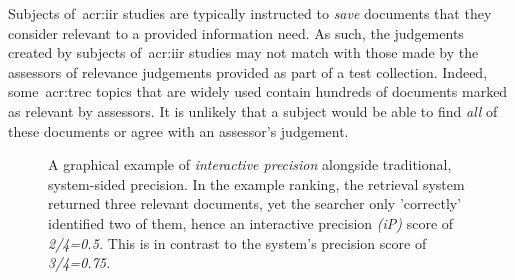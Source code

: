 Subjects of~\gls{acr:iir} studies are typically instructed to \emph{save} documents that they consider relevant to a provided information need. As such, the judgements created by subjects of~\gls{acr:iir} studies may not match with those made by the assessors of relevance judgements provided as part of a test collection. Indeed, some~\gls{acr:trec} topics that are widely used contain hundreds of documents marked as relevant by assessors. It is unlikely that a subject would be able to find \emph{all} of these documents or agree with an assessor's judgement.

\begin{figure}[t!]
    \centering
    \caption[Comparison of precision and interactive precision]{A graphical example of \emph{interactive precision} alongside traditional, system-sided precision. In the example ranking, the retrieval system returned three relevant documents, yet the searcher only 'correctly' identified two of them, hence an interactive precision \emph{(iP)} score of \emph{2/4=0.5.} This is in contrast to the system's precision score of \emph{3/4=0.75.}}
    \vspace*{-6mm}
    \label{fig:interactive_precision}
\end{figure}

